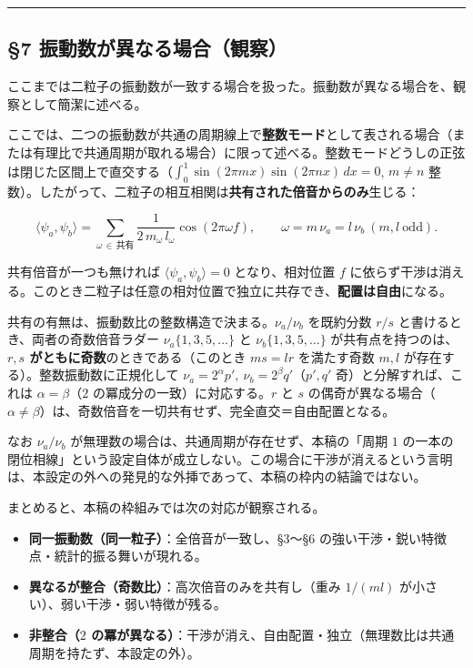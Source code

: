 \documentclass[
]{ltjsarticle}
\providecommand{\tightlist}{%
  \setlength{\itemsep}{0pt}\setlength{\parskip}{0pt}}
\begin{document}
\begin{center}\rule{0.5\linewidth}{0.5pt}\end{center}

\subsection{§7
振動数が異なる場合（観察）}\label{ux632fux52d5ux6570ux304cux7570ux306aux308bux5834ux5408ux89b3ux5bdf}

ここまでは二粒子の振動数が一致する場合を扱った。振動数が異なる場合を、観察として簡潔に述べる。

ここでは、二つの振動数が共通の周期線上で\textbf{整数モード}として表される場合（または有理比で共通周期が取れる場合）に限って述べる。整数モードどうしの正弦は閉じた区間上で直交する（\(\int_0^1\sin(2\pi m x)\sin(2\pi n x)\,dx=0\),
\(m\neq n\)
整数）。したがって、二粒子の相互相関は\textbf{共有された倍音からのみ}生じる：

\[\langle\psi_a,\psi_b\rangle=\sum_{\omega\,\in\,\text{共有}}\frac{1}{2\,m_\omega\,l_\omega}\cos(2\pi\omega f),\qquad \omega=m\,\nu_a=l\,\nu_b\ (m,l\ \text{odd}).\]

共有倍音が一つも無ければ \(\langle\psi_a,\psi_b\rangle=0\)
となり、相対位置 \(f\)
に依らず干渉は消える。このとき二粒子は任意の相対位置で独立に共存でき、\textbf{配置は自由}になる。

共有の有無は、振動数比の整数構造で決まる。\(\nu_a/\nu_b\) を既約分数
\(r/s\) と書けるとき、両者の奇数倍音ラダー \(\nu_a\{1,3,5,\dots\}\) と
\(\nu_b\{1,3,5,\dots\}\) が共有点を持つのは、\textbf{\(r,s\)
がともに奇数}のときである（このとき \(m s=l r\) を満たす奇数 \(m,l\)
が存在する）。整数振動数に正規化して
\(\nu_a=2^{\alpha}p',\ \nu_b=2^{\beta}q'\)（\(p',q'\)
奇）と分解すれば、これは \(\alpha=\beta\)（\(2\)
の冪成分の一致）に対応する。\(r\) と \(s\)
の偶奇が異なる場合（\(\alpha\neq\beta\)）は、奇数倍音を一切共有せず、完全直交＝自由配置となる。

なお \(\nu_a/\nu_b\) が無理数の場合は、共通周期が存在せず、本稿の「周期
\(1\)
の一本の閉位相線」という設定自体が成立しない。この場合に干渉が消えるという言明は、本設定の外への発見的な外挿であって、本稿の枠内の結論ではない。

まとめると、本稿の枠組みでは次の対応が観察される。

\begin{itemize}
\tightlist
\item
  \textbf{同一振動数（同一粒子）}：全倍音が一致し、§3〜§6
  の強い干渉・鋭い特徴点・統計的振る舞いが現れる。
\item
  \textbf{異なるが整合（奇数比）}：高次倍音のみを共有し（重み
  \(1/(m l)\) が小さい）、弱い干渉・弱い特徴が残る。
\item
  \textbf{非整合（\(2\)
  の冪が異なる）}：干渉が消え、自由配置・独立（無理数比は共通周期を持たず、本設定の外）。
\end{itemize}
\end{document}
